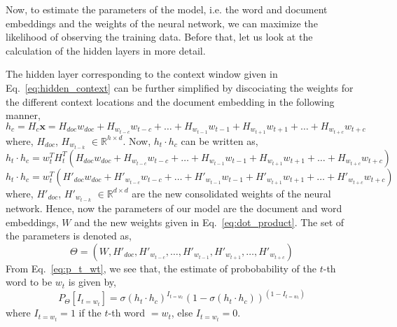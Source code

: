 \documentclass{article}
\begin{document}
Now, to estimate the parameters of the model, i.e. the word and document embeddings and the weights of the neural network, we can maximize the likelihood of observing the training data. Before that, let us look at the calculation of the hidden layers in more detail.

The hidden layer corresponding to the context window given in Eq.~\ref{eq:hidden_context} can be further simplified by discociating the weights for the different context locations and the document embedding in the following manner,
\begin{equation}
\label{eq:h_context_broken}
h_{c} = H_{c} \textbf{x} = H_{doc}w_{doc} + H_{w_{t-c}}w_{t-c} + \ldots + H_{w_{t-1}}w_{t-1} + H_{w_{t+1}}w_{t+1} + \ldots + H_{w_{t+c}}w_{t+c}
\end{equation}
where, $H_{doc}$, $H_{w_{t-k}}$ $\in \mathbb{R}^{h \times d}$. 
Now, $h_{t}\cdot h_{c}$ can be written as,
\begin{equation}
h_{t}\cdot h_{c} =  w_{t}^{T}H_{t}^{T}(H_{doc}w_{doc} + H_{w_{t-c}}w_{t-c} + \ldots + H_{w_{t-1}}w_{t-1} + H_{w_{t+1}}w_{t+1} + \ldots + H_{w_{t+c}}w_{t+c})
\end{equation}
\begin{equation}
\label{eq:dot_product}
h_{t}\cdot h_{c} =  w_{t}^{T}(H'_{doc}w_{doc} + H'_{w_{t-c}}w_{t-c} + \ldots + H'_{w_{t-1}}w_{t-1} + H'_{w_{t+1}}w_{t+1} + \ldots + H'_{w_{t+c}}w_{t+c})
\end{equation}
where, $H'_{doc}$, $H'_{w_{t-k}}$ $\in \mathbb{R}^{d \times d}$ are the new consolidated weights of the neural network.
Hence, now the parameters of our model are the document and word embeddings, $W$ and the new weights given in Eq.~\ref{eq:dot_product}. The set of the parameters is denoted as, 
\begin{equation}
\label{eq:parameters}
\Theta = (W, H'_{doc}, H'_{w_{t-c}}, \ldots, H'_{w_{t-1}}, H'_{w_{t+1}}, \ldots, H'_{w_{t+c}})
\end{equation}
From Eq.~\ref{eq:p_t_wt}, we see that, the estimate of probobability of the $t$-th word to be $w_{t}$ is given by,
\begin{equation}
\label{eq:prob}
P_{\Theta}\left[I_{t=w_{t}}\right] =  \sigma(h_{t}\cdot h_{c})^{I_{t=w_{t}}}(1 - \sigma(h_{t}\cdot h_{c}))^{(1 - I_{t=w_{t}})}
\end{equation}
where $I_{t=w_{t}} = 1$ if the $t$-th word $= w_{t}$, else $I_{t=w_{t}}=0$.
\end{document}
